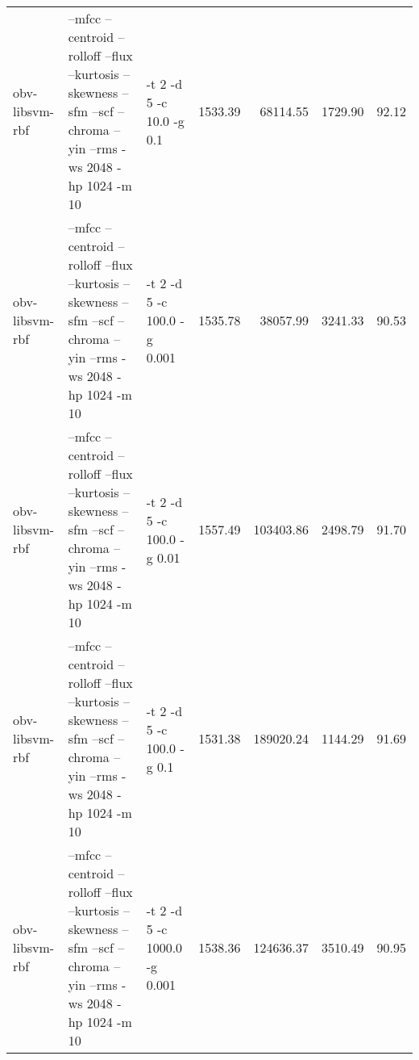 \documentclass[11pt,a4paper]{article}
\begin{document}
\begin{tabular}{lllrrrr}
 obv-libsvm-rbf  &  --mfcc --centroid --rolloff --flux --kurtosis --skewness --sfm --scf --chroma --yin --rms -ws 2048 -hp 1024 -m 10  &  -t 2 -d 5  -c 10.0   -g 0.1     &  1533.39  &   68114.55  &   1729.90  &  92.12  \\
 obv-libsvm-rbf  &  --mfcc --centroid --rolloff --flux --kurtosis --skewness --sfm --scf --chroma --yin --rms -ws 2048 -hp 1024 -m 10  &  -t 2 -d 5  -c 100.0  -g 0.001   &  1535.78  &   38057.99  &   3241.33  &  90.53  \\
 obv-libsvm-rbf  &  --mfcc --centroid --rolloff --flux --kurtosis --skewness --sfm --scf --chroma --yin --rms -ws 2048 -hp 1024 -m 10  &  -t 2 -d 5  -c 100.0  -g 0.01    &  1557.49  &  103403.86  &   2498.79  &  91.70  \\
 obv-libsvm-rbf  &  --mfcc --centroid --rolloff --flux --kurtosis --skewness --sfm --scf --chroma --yin --rms -ws 2048 -hp 1024 -m 10  &  -t 2 -d 5  -c 100.0  -g 0.1     &  1531.38  &  189020.24  &   1144.29  &  91.69  \\
 obv-libsvm-rbf  &  --mfcc --centroid --rolloff --flux --kurtosis --skewness --sfm --scf --chroma --yin --rms -ws 2048 -hp 1024 -m 10  &  -t 2 -d 5  -c 1000.0 -g 0.001   &  1538.36  &  124636.37  &   3510.49  &  90.95  \\
\end{tabular}
\end{document}

